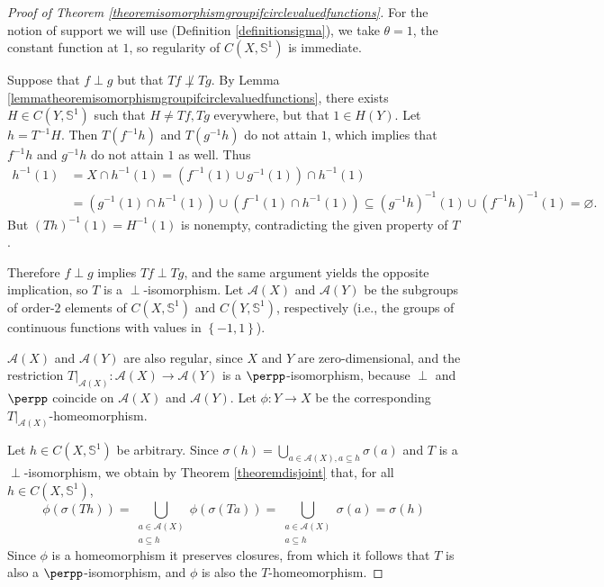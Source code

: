 \begin{proof}[Proof of Theorem \ref{theoremisomorphismgroupifcirclevaluedfunctions}]
For the notion of support we will use (Definition \ref{definitionsigma}), we take $\theta=1$, the constant function at $1$, so regularity of $C(X,\mathbb{S}^1)$ is immediate. 

Suppose that $f\perp g$ but that $Tf\not\perp Tg$. By Lemma \ref{lemmatheoremisomorphismgroupifcirclevaluedfunctions}, there exists $H\in C(Y,\mathbb{S}^1)$ such that $H\neq Tf,Tg$ everywhere, but that $1\in H(Y)$. Let $h=T^{-1}H$. Then $T(f^{-1}h)$ and $T(g^{-1}h)$ do not attain $1$, which implies that $f^{-1}h$ and $g^{-1}h$ do not attain $1$ as well. Thus
\begin{align*}
h^{-1}(1)&=X\cap h^{-1}(1)=(f^{-1}(1)\cup g^{-1}(1))\cap h^{-1}(1)\\
&=(g^{-1}(1)\cap h^{-1}(1))\cup(f^{-1}(1)\cap h^{-1}(1))\subseteq (g^{-1}h)^{-1}(1)\cup (f^{-1}h)^{-1}(1)=\varnothing.
\end{align*}
But $(Th)^{-1}(1)=H^{-1}(1)$ is nonempty, contradicting the given property of $T$.

Therefore $f\perp g$ implies $Tf\perp Tg$, and the same argument yields the opposite implication, so $T$ is a $\perp$-isomorphism. Let $\mathcal{A}(X)$ and $\mathcal{A}(Y)$ be the subgroups of order-$2$ elements of $C(X,\mathbb{S}^1)$ and $C(Y,\mathbb{S}^1)$, respectively (i.e., the groups of continuous functions with values in $\left\{-1,1\right\}$).

$\mathcal{A}(X)$ and $\mathcal{A}(Y)$ are also regular, since $X$ and $Y$ are zero-dimensional, and the restriction $T|_{\mathcal{A}(X)}:\mathcal{A}(X)\to \mathcal{A}(Y)$ is a $\perpp$-isomorphism, because $\perp$ and $\perpp$ coincide on $\mathcal{A}(X)$ and $\mathcal{A}(Y)$. Let $\phi:Y\to X$ be the corresponding $T|_{\mathcal{A}(X)}$-homeomorphism. 

Let $h\in C(X,\mathbb{S}^1)$ be arbitrary. Since $\sigma(h)=\bigcup_{a\in \mathcal{A}(X),a\subseteq h}\sigma(a)$ and $T$ is a $\perp$-isomorphism, we obtain by Theorem \ref{theoremdisjoint} that, for all $h\in C(X,\mathbb{S}^1)$,
\[\phi(\sigma(Th))=\bigcup_{\substack{a\in \mathcal{A}(X)\\a\subseteq h}}\phi(\sigma(Ta))=\bigcup_{\substack{a\in \mathcal{A}(X)\\a\subseteq h}}\sigma(a)=\sigma(h)\]
Since $\phi$ is a homeomorphism it preserves closures, from which it follows that $T$ is also a $\perpp$-isomorphism, and $\phi$ is also the $T$-homeomorphism.


\end{proof}
